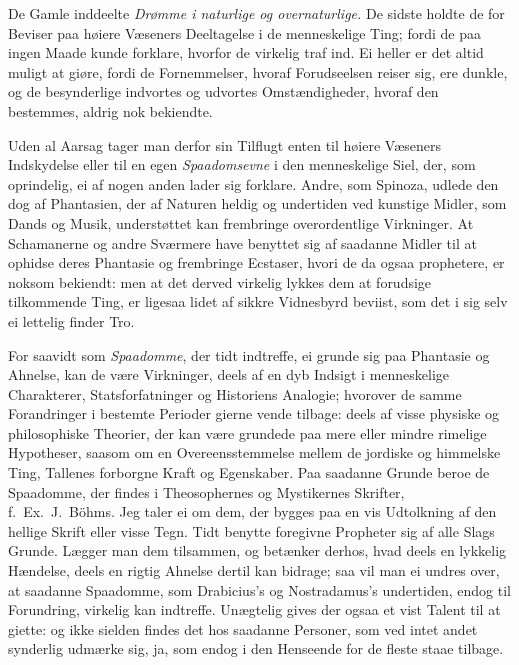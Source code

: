 \documentclass[12pt,a4paper]{article}
\newcommand{\opage}[1]{\marginnote{\footnotesize\textit{[#1]}}}
\begin{document}
De Gamle inddeelte \emph{Drømme i naturlige og overnaturlige.} De sidste holdte de for
Beviser paa høiere Væseners Deeltagelse i de menneskelige Ting; fordi de paa ingen Maade
kunde forklare, hvorfor de virkelig traf ind. Ei heller er det altid muligt at giøre,
fordi de Fornemmelser, hvoraf Forudseelsen reiser sig, ere dunkle, og de besynderlige
indvortes og udvortes Omstændigheder, hvoraf den bestemmes, aldrig nok bekiendte.

Uden al Aarsag tager man derfor sin Tilflugt enten til høiere Væseners Indskydelse eller
til en egen \emph{Spaadomsevne} i den menneskelige Siel, der, som oprindelig, ei af nogen
anden lader sig forklare. Andre, som Spinoza, udlede den dog af Phantasien, der af
Naturen heldig og undertiden ved kunstige Midler, som Dands og Musik, understøttet kan
frembringe overordentlige Virkninger. At Schamanerne og andre Sværmere have benyttet sig
af saadanne Midler til at ophidse
\opage{135} deres Phantasie og frembringe Ecstaser, hvori de da ogsaa prophetere, er noksom bekiendt:
men at det derved virkelig lykkes dem at forudsige tilkommende Ting, er ligesaa lidet af
sikkre Vidnesbyrd beviist, som det i sig selv ei lettelig finder Tro.

For saavidt som \emph{Spaadomme}, der tidt indtreffe, ei grunde sig paa Phantasie og
Ahnelse, kan de være Virkninger, deels af en dyb Indsigt i menneskelige Charakterer,
Statsforfatninger og Historiens Analogie; hvorover de samme Forandringer i bestemte
Perioder gierne vende tilbage: deels af visse physiske og philosophiske Theorier, der kan
være grundede paa mere eller mindre rimelige Hypotheser, saasom om en Overeensstemmelse
mellem de jordiske og himmelske Ting, Tallenes forborgne Kraft og Egenskaber. Paa
saadanne Grunde beroe de Spaadomme, der findes i Theosophernes og Mystikernes Skrifter,
f.~Ex.\ J.~Böhms. Jeg taler ei om dem, der bygges paa en vis Udtolkning af den hellige
Skrift eller visse Tegn. Tidt benytte foregivne Propheter sig af alle Slags Grunde.
Lægger man dem tilsammen, og betænker derhos, hvad deels en lykkelig Hændelse, deels en
rigtig Ahnelse dertil kan bidrage; saa vil man ei undres over, at saadanne Spaadomme, som
Drabicius's og Nostradamus's undertiden, endog til Forundring, virkelig kan indtreffe.
Unægtelig gives der ogsaa et vist Talent til at giette: og ikke sielden findes det hos
saadanne Personer, som ved intet
\opage{136} andet synderlig udmærke sig, ja, som endog i den Henseende for de fleste staae tilbage.
\end{document}
